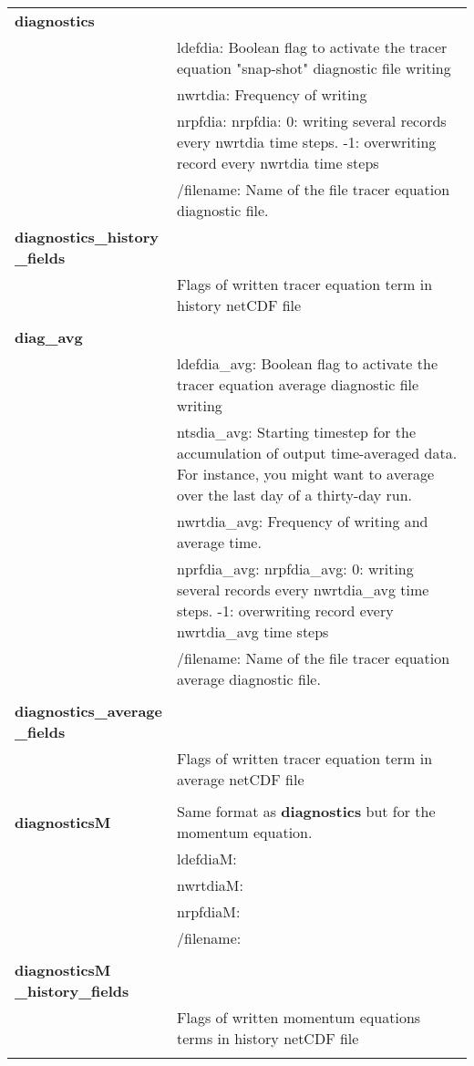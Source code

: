 \begin{longtable}{|p{0.25\linewidth}|p{0.75\linewidth}|}
\large{\textbf{diagnostics}} &     \\
&ldefdia: Boolean flag to activate the tracer equation "snap-shot" diagnostic file writing \\
&nwrtdia: Frequency of writing     \\
&nrpfdia: nrpfdia: 0: writing several records every nwrtdia time steps. -1: overwriting record
every nwrtdia time steps   \\
&/filename: Name of the file tracer equation diagnostic file.\\

\large{\textbf{diagnostics\_history \_fields}} &     \\
& Flags of written tracer equation term in history netCDF file \\
& \\


\large{\textbf{diag\_avg}} &     \\
&ldefdia\_avg: Boolean flag to activate the tracer equation average diagnostic file writing  \\
&ntsdia\_avg: Starting timestep for the accumulation of output time-averaged data. For
instance, you might want to average over the last day of a thirty-day run.  \\
&nwrtdia\_avg: Frequency of writing and average time.   \\
&nprfdia\_avg: nrpfdia\_avg: 0: writing several records every nwrtdia\_avg time steps. -1: overwriting record
every nwrtdia\_avg time steps \\
&/filename: Name of the file tracer equation average diagnostic file. \\
&  \\ 

\large{\textbf{diagnostics\_average \_fields}} &     \\
& Flags of written tracer equation term in average netCDF file\\
& \\

\large{\textbf{diagnosticsM}} &   Same format as \large{\textbf{diagnostics}} but for the momentum equation. \\
&ldefdiaM:     \\
&nwrtdiaM:     \\
&nrpfdiaM:     \\
&/filename:    \\
&  \\ 

\large{\textbf{diagnosticsM \_history\_fields}} &     \\
& Flags of written momentum equations terms in history netCDF file\\
& \\


\end{longtable}
